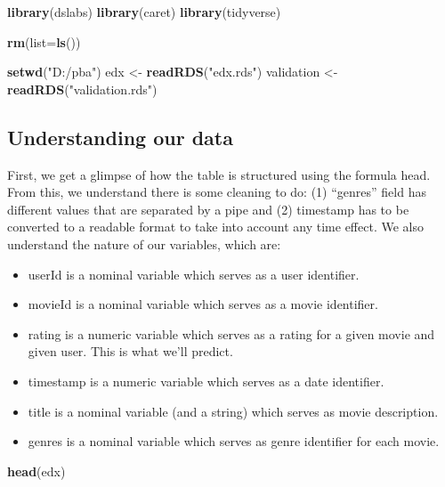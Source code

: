 \documentclass[]{article}
\newenvironment{Shaded}{\begin{snugshade}}{\end{snugshade}}
\newcommand{\KeywordTok}[1]{\textcolor[rgb]{0.13,0.29,0.53}{\textbf{#1}}}
\newcommand{\DataTypeTok}[1]{\textcolor[rgb]{0.13,0.29,0.53}{#1}}
\newcommand{\StringTok}[1]{\textcolor[rgb]{0.31,0.60,0.02}{#1}}
\newcommand{\NormalTok}[1]{#1}
\providecommand{\tightlist}{%
  \setlength{\itemsep}{0pt}\setlength{\parskip}{0pt}}
\begin{document}
\begin{Shaded}
\begin{Highlighting}[]
\KeywordTok{library}\NormalTok{(dslabs)}
\KeywordTok{library}\NormalTok{(caret)}
\KeywordTok{library}\NormalTok{(tidyverse)}

\KeywordTok{rm}\NormalTok{(}\DataTypeTok{list=}\KeywordTok{ls}\NormalTok{())}

\KeywordTok{setwd}\NormalTok{(}\StringTok{"D:/pba"}\NormalTok{)}
\NormalTok{edx <-}\StringTok{ }\KeywordTok{readRDS}\NormalTok{(}\StringTok{"edx.rds"}\NormalTok{)}
\NormalTok{validation <-}\StringTok{ }\KeywordTok{readRDS}\NormalTok{(}\StringTok{"validation.rds"}\NormalTok{)}
\end{Highlighting}
\end{Shaded}

\subsection{Understanding our data}\label{understanding-our-data}

First, we get a glimpse of how the table is structured using the formula
head. From this, we understand there is some cleaning to do: (1)
``genres'' field has different values that are separated by a pipe and
(2) timestamp has to be converted to a readable format to take into
account any time effect. We also understand the nature of our variables,
which are:

\begin{itemize}
\tightlist
\item
  userId is a nominal variable which serves as a user identifier.
\item
  movieId is a nominal variable which serves as a movie identifier.
\item
  rating is a numeric variable which serves as a rating for a given
  movie and given user. This is what we'll predict.
\item
  timestamp is a numeric variable which serves as a date identifier.
\item
  title is a nominal variable (and a string) which serves as movie
  description.
\item
  genres is a nominal variable which serves as genre identifier for each
  movie.
\end{itemize}

\begin{Shaded}
\begin{Highlighting}[]
\KeywordTok{head}\NormalTok{(edx)}
\end{Highlighting}
\end{Shaded}
\end{document}
